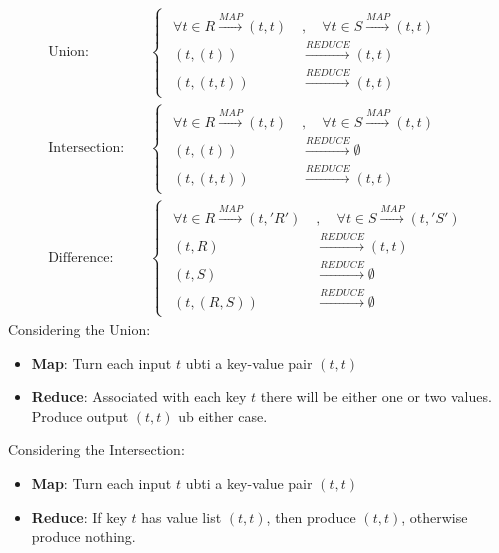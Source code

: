 \begin{enumerate}
    \[
    \begin{aligned}
        \text{Union:}\quad &\begin{cases}
            \begin{split}
                \forall t\in R \xrightarrow{MAP} (t,t)\; &, \quad \forall t\in S \xrightarrow{MAP} (t,t) \\
                (t, (t)) &\xrightarrow{REDUCE} (t,t)\\
                (t, (t,t)) &\xrightarrow{REDUCE} (t,t)
            \end{split}
        \end{cases}\\[10pt]
        \text{Intersection:}\quad &\begin{cases}
            \begin{split}
                \forall t\in R \xrightarrow{MAP} (t,t)\; &, \quad \forall t\in S \xrightarrow{MAP} (t,t) \\
                (t, (t)) &\xrightarrow{REDUCE} \emptyset\\
                (t, (t,t)) &\xrightarrow{REDUCE} (t,t)
            \end{split}
        \end{cases}\\[10pt]
        \text{Difference:}\quad &\begin{cases}
            \begin{split}
                \forall t\in R \xrightarrow{MAP} (t, 'R')\; &, \quad \forall t\in S \xrightarrow{MAP} (t,'S') \\
                (t, R) &\xrightarrow{REDUCE} (t,t)\\
                (t, S) &\xrightarrow{REDUCE} \emptyset \\
                (t, (R,S)) &\xrightarrow{REDUCE} \emptyset
            \end{split}
        \end{cases}
    \end{aligned}
    \]
    Considering the Union:
    \begin{itemize}
        \item \textbf{Map}: Turn each input $t$ ubti a key-value pair $(t, t)$
        \item \textbf{Reduce}: Associated with each key $t$ there will be either one or two values. Produce output $(t, t)$ ub either case. 
    \end{itemize}

    Considering the Intersection: 
    \begin{itemize}
        \item \textbf{Map}: Turn each input $t$ ubti a key-value pair $(t, t)$
        \item \textbf{Reduce}: If key $t$ has value list $(t, t)$, then produce $(t, t)$, otherwise produce nothing.
    \end{itemize}


\end{enumerate}
